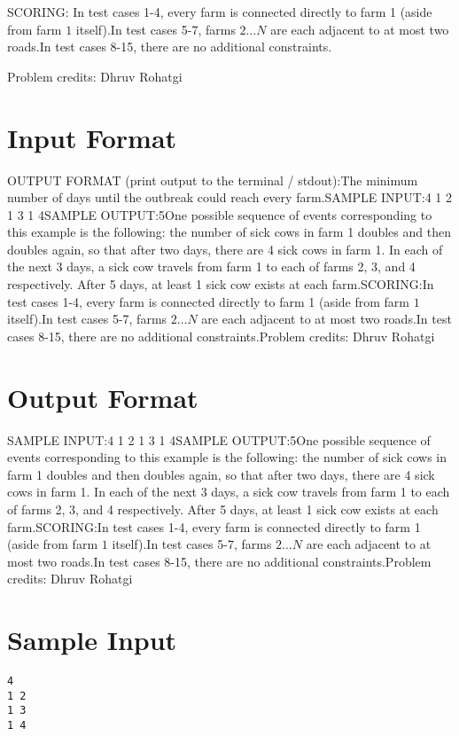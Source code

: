 \documentclass[12pt]{article}
\begin{document}
SCORING:
In test cases 1-4, every farm is connected directly to farm 1 (aside from
farm $1$ itself).In test cases 5-7, farms $2\ldots N$ are each adjacent to at most two
roads.In test cases 8-15, there are no additional constraints.


Problem credits: Dhruv Rohatgi



\section*{Input Format}
OUTPUT FORMAT (print output to the terminal / stdout):The minimum number of days until the outbreak could reach every farm.SAMPLE INPUT:4
1 2
1 3
1 4SAMPLE OUTPUT:5One possible sequence of events corresponding to this example is the following:
the number of sick cows in farm 1 doubles and then doubles again, so that after
two days, there are 4 sick cows in farm 1.  In each of the next 3 days, a sick
cow travels from farm 1 to each of farms 2, 3, and 4 respectively.  After 5
days, at least 1 sick cow exists at each farm.SCORING:In test cases 1-4, every farm is connected directly to farm 1 (aside from
farm $1$ itself).In test cases 5-7, farms $2\ldots N$ are each adjacent to at most two
roads.In test cases 8-15, there are no additional constraints.Problem credits: Dhruv Rohatgi

\section*{Output Format}
SAMPLE INPUT:4
1 2
1 3
1 4SAMPLE OUTPUT:5One possible sequence of events corresponding to this example is the following:
the number of sick cows in farm 1 doubles and then doubles again, so that after
two days, there are 4 sick cows in farm 1.  In each of the next 3 days, a sick
cow travels from farm 1 to each of farms 2, 3, and 4 respectively.  After 5
days, at least 1 sick cow exists at each farm.SCORING:In test cases 1-4, every farm is connected directly to farm 1 (aside from
farm $1$ itself).In test cases 5-7, farms $2\ldots N$ are each adjacent to at most two
roads.In test cases 8-15, there are no additional constraints.Problem credits: Dhruv Rohatgi

\section*{Sample Input}
\begin{verbatim}
4
1 2
1 3
1 4
\end{verbatim}
\end{document}
